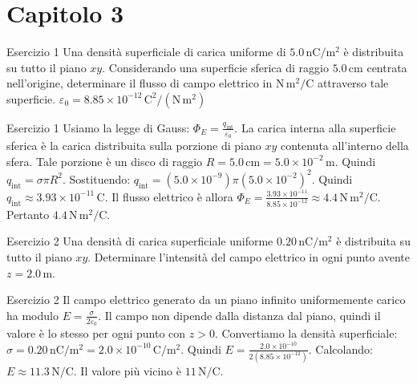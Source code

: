 \documentclass[a4paper]{article}
\begin{document}
\section{Capitolo 3}
\begin{snippetexercise}{Esercizio 1}
    Una densità superficiale di carica uniforme di
    \(5.0\,\mathrm{nC/m^2}\) è distribuita su tutto il piano \(xy\).
    Considerando una superficie sferica di raggio \(5.0\,\mathrm{cm}\)
    centrata nell'origine, determinare il flusso di campo elettrico in
    \(\mathrm{N\,m^2/C}\) attraverso tale superficie.
    \(\varepsilon_0 = 8.85 \times 10^{-12}\,\mathrm{C^2/(N\,m^2)}\)

\end{snippetexercise}
\begin{snippetsolution}{Esercizio 1}
    Usiamo la legge di Gauss:
    \(\Phi_E = \frac{q_{\mathrm{int}}}{\varepsilon_0}.\)
    La carica interna alla superficie sferica è la carica distribuita sulla
    porzione di piano \(xy\) contenuta all'interno della sfera. Tale porzione è
    un disco di raggio
    \(R = 5.0\,\mathrm{cm} = 5.0 \times 10^{-2}\,\mathrm{m}.\)
    Quindi
    \(q_{\mathrm{int}} = \sigma \pi R^2.\)
    Sostituendo:
    \(q_{\mathrm{int}} = \left(5.0 \times 10^{-9}\right) \pi \left(5.0 \times 10^{-2}\right)^2.\)
    Quindi
    \(q_{\mathrm{int}} \approx 3.93 \times 10^{-11}\,\mathrm{C}.\)
    Il flusso elettrico è allora
    \(\Phi_E = \frac{3.93 \times 10^{-11}}{8.85 \times 10^{-12}} \approx 4.4\,\mathrm{N\,m^2/C}.\)
    Pertanto
    \(\boxed{4.4\,\mathrm{N\,m^2/C}}.\)
\end{snippetsolution}
\begin{snippetexercise}{Esercizio 2}
    Una densità di carica superficiale uniforme
    \(0.20\,\mathrm{nC/m^2}\) è distribuita su tutto il piano \(xy\).
    Determinare l'intensità del campo elettrico in ogni punto avente
    \(z = 2.0\,\mathrm{m}\).

\end{snippetexercise}
\begin{snippetsolution}{Esercizio 2}
    Il campo elettrico generato da un piano infinito uniformemente carico ha
    modulo
    \(E = \frac{\sigma}{2\varepsilon_0}.\)
    Il campo non dipende dalla distanza dal piano, quindi il valore è lo stesso
    per ogni punto con \(z > 0\).
    Convertiamo la densità superficiale:
    \(\sigma = 0.20\,\mathrm{nC/m^2} = 2.0 \times 10^{-10}\,\mathrm{C/m^2}.\)
    Quindi
    \(E = \frac{2.0 \times 10^{-10}} {2(8.85 \times 10^{-12})}.\)
    Calcolando:
    \(E \approx 11.3\,\mathrm{N/C}.\)
    Il valore più vicino è
    \(\boxed{11\,\mathrm{N/C}}.\)
\end{snippetsolution}
\end{document}
